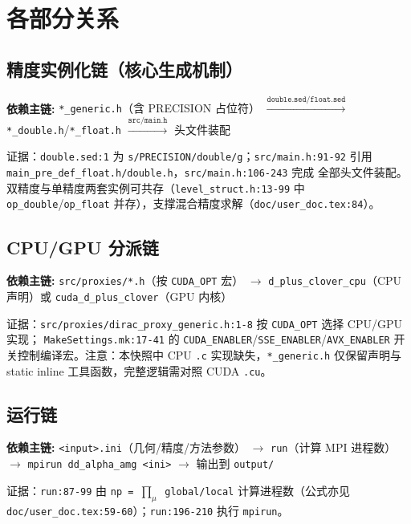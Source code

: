 \documentclass[UTF8]{ctexart}
\begin{document}
\section{各部分关系}

\subsection{精度实例化链（核心生成机制）}
\begin{keybox}
\textbf{依赖主链:} \textcolor{relation}{\texttt{*\_generic.h}（含 PRECISION 占位符）
$\xrightarrow{\texttt{double.sed}/\texttt{float.sed}}$ \texttt{*\_double.h}/\texttt{*\_float.h}
$\xrightarrow{\texttt{src/main.h}}$ 头文件装配}
\end{keybox}
证据：\texttt{double.sed:1} 为 \texttt{s/PRECISION/double/g}；\texttt{\nolinkurl{src/main.h:91-92}}
引用 \texttt{\nolinkurl{main_pre_def_float.h/double.h}}，\texttt{\nolinkurl{src/main.h:106-243}} 完成
全部头文件装配。
双精度与单精度两套实例可共存（\texttt{\nolinkurl{level_struct.h:13-99}} 中
\texttt{op\_double}/\texttt{op\_float} 并存），支撑混合精度求解（\texttt{\nolinkurl{doc/user_doc.tex:84}}）。

\subsection{CPU/GPU 分派链}
\begin{keybox}
\textbf{依赖主链:} \textcolor{relation}{\texttt{src/proxies/*.h}（按 \texttt{CUDA\_OPT} 宏）
$\rightarrow$ \texttt{d\_plus\_clover\_cpu}（CPU 声明）或 \texttt{cuda\_d\_plus\_clover}（GPU 内核）}
\end{keybox}
证据：\texttt{src/proxies/dirac\_proxy\_generic.h:1-8} 按 \texttt{CUDA\_OPT} 选择 CPU/GPU 实现；
\texttt{MakeSettings.mk:17-41} 的 \texttt{CUDA\_ENABLER}/\texttt{SSE\_ENABLER}/\texttt{AVX\_ENABLER}
开关控制编译宏。\textcolor{warn}{注意}：本快照中 CPU \texttt{.c} 实现缺失，\texttt{*\_generic.h}
仅保留声明与 static inline 工具函数，完整逻辑需对照 CUDA \texttt{.cu}。

\subsection{运行链}
\begin{keybox}
\textbf{依赖主链:} \textcolor{relation}{\texttt{<input>.ini}（几何/精度/方法参数）
$\rightarrow$ \texttt{run}（计算 MPI 进程数）$\rightarrow$ \texttt{mpirun dd\_alpha\_amg <ini>}
$\rightarrow$ 输出到 \texttt{output/}}
\end{keybox}
证据：\texttt{run:87-99} 由 \texttt{np = $\prod_\mu$ global/local} 计算进程数（公式亦见
\texttt{doc/user\_doc.tex:59-60}）；\texttt{run:196-210} 执行 \texttt{mpirun}。
\end{document}
